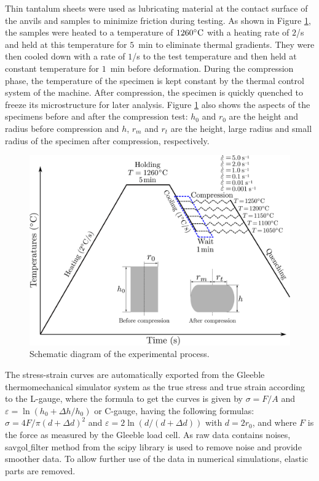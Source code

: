 \documentclass[twoside,english,1p,final,sort&compress]{elsarticle}
\theoremstyle{plain}
\begin{document}
Thin tantalum sheets were used as lubricating material at the contact surface of the anvils and samples to minimize friction during testing. As shown in Figure \ref{fig:GleebleProcess}, the samples were heated to a temperature of $1260\celsius$ with a heating rate of $2$\celsius/s and held at this temperature for $5$~min to eliminate thermal gradients. They were then cooled down with a rate of $1$\celsius/s to the test temperature and then held at constant temperature for $1$~min before deformation. During the compression phase, the temperature of the specimen is kept constant by the thermal control system of the machine. After compression, the specimen is quickly quenched to freeze its microstructure for later analysis. Figure \ref{fig:GleebleProcess} also shows the aspects of the specimens before and after the compression test: $h_0$ and $r_0$ are the height and radius before compression and $h$, $r_m$ and $r_t$ are the height, large radius and small radius of the specimen after compression, respectively.
\begin{figure}[!ht]
\centering
\includegraphics[width=0.8\columnwidth]{Figures/GleebleProcess}
\caption{Schematic diagram of the experimental process.}
\label{fig:GleebleProcess}
\end{figure}

The stress-strain curves are automatically exported from the Gleeble thermomechanical simulator system as the true stress and true strain according to the L-gauge, where the formula to get the curves is given by $\sigma=F/A$ and $\varepsilon=\ln\left(h_0+\Delta h / h_0\right)$ or C-gauge,  having the following formulas: $\sigma = 4F/\pi(d+\Delta d)^2$ and $\varepsilon = 2\ln(d/(d+\Delta d))$ with $d = 2r_0$, and where $F$ is the force as measured by the Gleeble load cell. As raw data contains noises, savgol$\_$filter method from the scipy library is used to remove noise and provide smoother data. To allow further use of the data in numerical simulations, elastic parts are removed.
\end{document}
